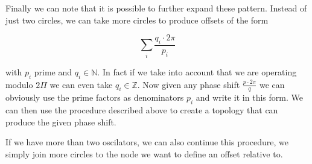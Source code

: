 Finally we can note that it is possible to further expand these pattern. Instead of just two circles, we can take more circles to produce offsets of the form

\[
  \sum_{i}{\frac{q_i {\cdot} 2 \pi}{p_i}}
\]

with $p_i$ prime and $q_i \in \mathbb{N}$. In fact if we take into account that we are operating modulo $2 \Pi$ we can even take $q_i \in \mathbb{Z}$. Now given any phase shift $\frac{p {\cdot} 2 \pi}{q}$ we can obviously use the prime factors as denominators $p_i$ and write it in this form. We can then use the procedure described above to create a topology that can produce the given phase shift. 

If we have more than two oscilators, we can also continue this procedure, we simply join more circles to the node we want to define an offset relative to. 